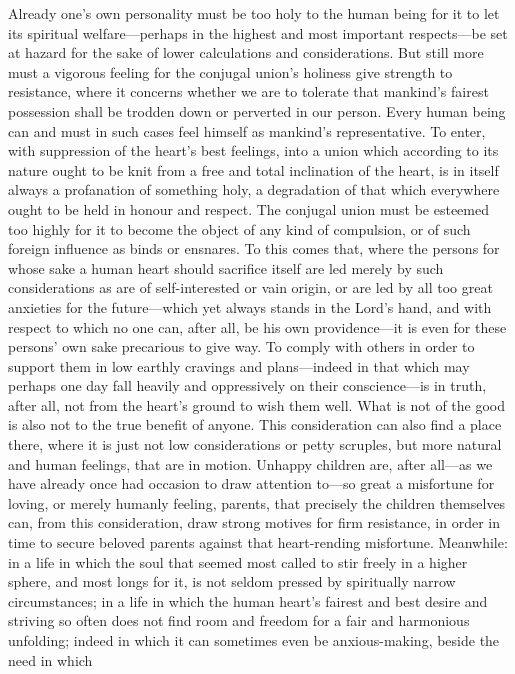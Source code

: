 \documentclass[12pt,a4paper]{book}
\begin{document}
Already one's own personality must be too holy to the human being for it to
let its spiritual welfare---perhaps in the highest and most important
respects---be set at hazard for the sake of lower calculations and
considerations. But still more must a vigorous feeling for the conjugal
union's holiness give strength to resistance, where it concerns whether we
are to tolerate that mankind's fairest possession shall be trodden down or
perverted in our person. Every human being can and must in such cases feel
himself as mankind's representative.
To enter, with suppression of the heart's best feelings, into a union which
according to its nature ought to be knit from a free and total inclination
of the heart, is in itself always a profanation of something holy, a
degradation of that which everywhere ought to be held in honour and
respect. The conjugal union must be esteemed too highly for it to become
the object of any kind of compulsion, or of such foreign influence as binds
or ensnares. To this comes that, where the persons for whose sake a human
heart should sacrifice itself are led merely by such considerations as are
of self-interested or vain origin, or are led by all too great anxieties
for the future---which yet always stands in the Lord's hand, and with
respect to which no one can, after all, be his own providence---it is even
for these persons' own sake precarious to give way. To comply with others
in order to support them in low earthly cravings and plans---indeed in that
which may perhaps one day fall heavily and oppressively on their
conscience---is in truth, after all, not from the heart's ground to wish
them well. What is not of the good is also not to the true benefit of
anyone. This consideration can also find a place there, where it is just
not low considerations or petty scruples, but more natural and human
feelings, that are in motion. Unhappy children are, after all---as we have
already once had occasion to draw attention to---so great a misfortune for
loving, or merely humanly feeling, parents, that precisely the children
themselves can, from this consideration, draw strong motives for firm
resistance, in order in time to secure beloved parents against that
heart-rending misfortune. Meanwhile: in a life in which the soul that
seemed most called to stir freely in a higher sphere, and most longs for
it, is not seldom pressed by spiritually narrow circumstances; in a life in
which the human heart's fairest and best desire and striving so often does
not find room and freedom for a fair and harmonious unfolding; indeed in
which it can sometimes even be anxious-making, beside the need in which
\end{document}
